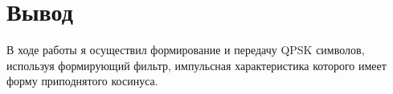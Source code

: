 \chapter{Вывод}
\label{ch:chap3}

В ходе работы я осуществил формирование и передачу QPSK символов, используя формирующий фильтр, импульсная
характеристика которого имеет форму приподнятого косинуса.

\endinput
